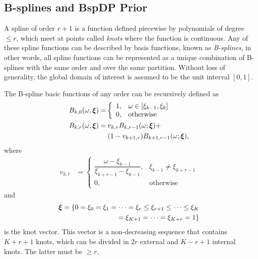 \documentclass[twocolumn,final]{svjour3}
\newcommand{\bm}[1]{\mbox{\boldmath $#1$}}
\newcommand{\pmr}{ \color{red}}
\begin{document}
\subsection*{B-splines and BspDP Prior}

A spline of {\pmr order} $r+1$ is a function defined piecewise by polynomials of degree $\leq r$, which meet at points called \textit{knots} where the function is continuous.  Any of these spline functions can be described by basis functions, known as \textit{B-splines}, in other words, all spline functions can be represented as a unique combination of B-splines with the same order and over the same partition.  Without loss of generality, the global domain of interest is assumed to be the unit interval $[0,1]$.

The B-spline basic functions of any order can be recursively defined as
\begin{align*}
B_{k,0}(\omega, \bm{\xi})=&	
\left\{
\begin{array}{ll}
1, & \omega \in [\xi_{k-1}, \xi_{k}] \\
0, & \mbox{otherwise} 
\end{array}
\right.\\
B_{k,r}(\omega, \bm{\xi}) = & \:v_{k,r}B_{k,r-1}(\omega; \bm{\xi}) + \\
& \: (1-v_{k+1,r})B_{k+1,r-1}(\omega; \bm{\xi}),	
\end{align*}
where	   
\begin{align*}	   
v_{k,r}&=	
\left\{
\begin{array}{ll}
\dfrac{\omega - \xi_{k-1}}{\xi_{k+r-1} - \xi_{k-1}}, & \xi_{k-1} \neq \xi_{k+r-1}\\
0, & \mbox{otherwise} 
\end{array}
\right.
\end{align*}
and 
\begin{align*}
\bm{\xi} = \{0 = \xi_0 = \xi_1 = \cdots = \xi_r \leq \xi_{r+1} \leq \cdots \leq \xi_{K}\\ = \xi_{K+1} = \cdots = \xi_{K+r} = 1 \}
\end{align*}
is the knot vector.  This vector is a non-decreasing sequence that contains $K+r+1$ knots, which can be divided in $2r$ external and $K-r+1$ internal knots.  The latter must be $\geq r$.

\end{document}

